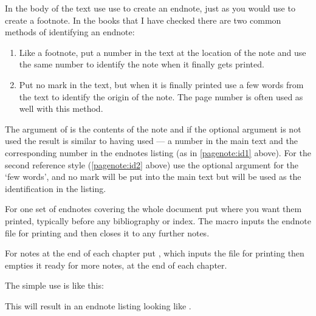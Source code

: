    In the body of the text use use \cmd{\pagenote} to create an endnote, just
as you would use \cmd{\footnote} to create a footnote. In the books that I have
checked there are two common methods of identifying an endnote:
\begin{enumerate}
\item Like a footnote, put a number in the text at the location 
of the note and use the same number to identify the note when it
finally gets printed.\label{pagenote:id1}
\item Put no mark in the text, but when it is finally 
      printed
use a few words from the text to identify the origin of the note. The page number
is often used as well with this method.\label{pagenote:id2}
\end{enumerate}
The  argument of \cmd{\pagenote} is the contents of the note and
if the optional  argument is not used the
result is similar to having used \cmd{\footnote} --- a number in the main text
and the corresponding number in the endnotes listing (as 
in \ref{pagenote:id1} above). For the second reference style 
(\ref{pagenote:id2} above) use the 
optional  argument for the `few words', and no mark will be put
into the main text but  will be used as the identification in
the listing.

   For one set of endnotes covering the whole document put 
\cmd{\printpagenotes} where you want them printed, typically before
any bibliography or index. The \cmd{\printpagenotes} macro inputs the
 endnote file for printing and then closes it to any further
notes.

For notes
at the end of each chapter put \cmd{\printpagenotes*}, which inputs
the  file for printing then empties it ready for more notes,
at the end of each chapter.

   The simple use is like this:
This will result in an endnote listing looking like .

